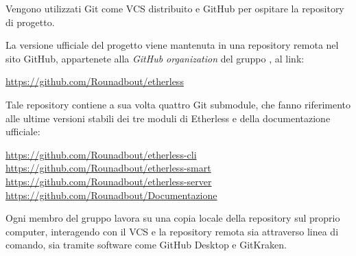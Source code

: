         Vengono utilizzati Git come VCS distribuito e GitHub per ospitare la repository di progetto.

        La versione ufficiale del progetto viene mantenuta in una repository remota nel sito GitHub, appartenete alla \textit{GitHub organization} del gruppo \Gruppo{}, al link:
        \begin{center}
          \url{https://github.com/Rounadbout/etherless}
        \end{center}
    	Tale repository contiene a sua volta quattro Git submodule, che fanno riferimento alle ultime versioni stabili dei tre moduli di Etherless e della documentazione ufficiale:
    	\begin{center}
    		\url{https://github.com/Rounadbout/etherless-cli}
    		\url{https://github.com/Rounadbout/etherless-smart}
    		\url{https://github.com/Rounadbout/etherless-server}
    		\url{https://github.com/Rounadbout/Documentazione}
    	\end{center}
        Ogni membro del gruppo lavora su una copia locale della repository sul proprio computer, interagendo con il VCS e la repository remota sia attraverso linea di comando, sia tramite software come GitHub Desktop e GitKraken.

